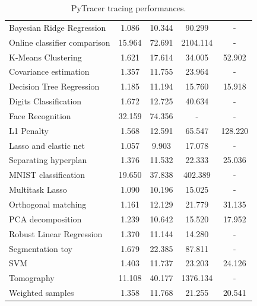 \documentclass[11pt]{article}
\newcommand{\pytracer}[0]{PyTracer\xspace}
\begin{document}
\begin{table}
\begin{subfigure}[t]{.75\linewidth}
\begin{tabular}{|l|c|c|c|c|}
    Bayesian Ridge Regression & 1.086 & 10.344 & 90.299 & -  \\
    Online classifier comparison & 15.964 & 72.691 & 2104.114 & -  \\
    K-Means Clustering & 1.621 & 17.614  & 34.005 & 52.902   \\
    Covariance estimation & 1.357 & 11.755 & 23.964  & -   \\
    Decision Tree Regression & 1.185 & 11.194 & 15.760 & 15.918  \\
    Digits Classification & 1.672 & 12.725 & 40.634 & - \\
    Face Recognition & 32.159  & 74.356 & - & - \\
    L1 Penalty & 1.568 & 12.591 & 65.547 & 128.220 \\
    Lasso and elastic net & 1.057 & 9.903 & 17.078 & -  \\
    Separating hyperplan & 1.376 & 11.532  & 22.333 & 25.036 \\
    MNIST classification & 19.650 & 37.838 & 402.389  & - \\
    Multitask Lasso & 1.090 &10.196 & 15.025  & - \\
    Orthogonal matching & 1.161 & 12.129 & 21.779   & 31.135 \\
    PCA decomposition & 1.239 & 10.642 & 15.520 & 17.952    \\
    Robust Linear Regression & 1.370 & 11.144  & 14.280  & - \\
    Segmentation toy &1.679 & 22.385 & 87.811  & - \\
    SVM & 1.403 & 11.737 & 23.203 & 24.126   \\
    Tomography & 11.108 & 40.177  & 1376.134 & -  \\
    Weighted samples & 1.358 & 11.768 & 21.255 & 20.541   \\
    \hline
    \end{tabular}
\end{subfigure}
    \caption{\pytracer tracing performances.}
    \label{tab:pytracer_overhead}
\end{table}

    
\end{document}
